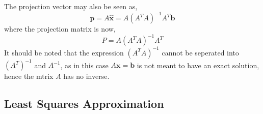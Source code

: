             The projection vector may also be seen as,
            \begin{equation}
                \boldsymbol{p} = A \boldsymbol{\hat{x}} = A(A^T A)^{-1}A^T \boldsymbol{b}
            \end{equation}
            where the projection matrix is now,
            \begin{equation}
                P = A(A^T A)^{-1} A^T
            \end{equation}
            It should be noted that the expression \((A^T A)^{-1}\) cannot be seperated into \((A^T)^{-1}\) and 
            \(A^{-1}\), as in this case \(A \boldsymbol{x} = \boldsymbol{b}\) is not meant to have an exact solution,
            hence the mtrix \(A\) has no inverse.

        \subsection*{Least Squares Approximation}
            
        
